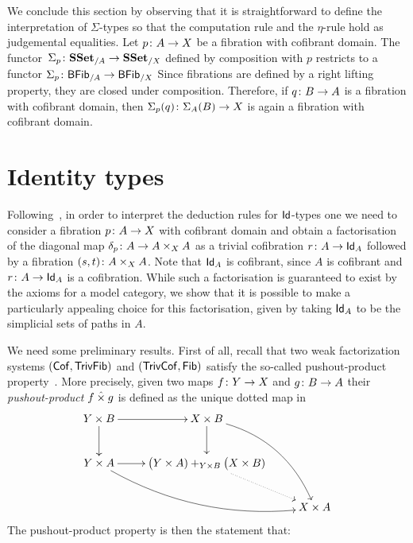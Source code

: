 \documentclass[reqno,10pt,a4paper,oneside,draft]{amsart}
\begin{document}
\begin{remark} 
We conclude this section by observing that it is straightforward to define the interpretation of
$\Sigma$-types so that the computation rule and the $\eta$-rule hold as judgemental equalities. 
Let  $p \colon A \to X$ be a fibration with cofibrant domain. The
functor~$\Sigma_p \colon \mathbf{SSet}_{/A} \to \mathbf{SSet}_{/X}$ defined by
composition with $p$ restricts to a functor
$\Sigma_p \colon \mathsf{BFib}_{/A}  \to \mathsf{BFib}_{/X}$
 Since fibrations are defined by a right lifting property, they are closed
under composition. Therefore, if $q \colon B \to A$ is a fibration with cofibrant domain, then
$\Sigma_p(q) \colon \Sigma_A(B) \to X$ is again a fibration with cofibrant domain.
\end{remark} 



\section{Identity types}

Following~\cite{awodey-warren:homotopy-idtype}, in order to interpret the deduction rules 
for $\mathsf{Id}$-types one we need to consider
a fibration $p \colon A \to X$ with cofibrant domain  and obtain a factorisation of the diagonal map $\delta_p \colon A \to A \times_X A$ as a trivial cofibration $r \colon A \to  \mathsf{Id}_A$ followed by a fibration
$(s,t) \colon A \times_X A$. Note that $\mathsf{Id}_A$ is cofibrant, since $A$ is cofibrant and $r \colon A \to \mathsf{Id}_A$ is a cofibration. While such a factorisation is guaranteed to exist by the axioms for a  model category, we show
that it is possible to make a particularly appealing choice for this factorisation, given by taking $\mathsf{Id}_A$ to be
the simplicial sets of paths in $A$. 

\medskip

We need some preliminary results. First of all, recall that
two weak factorization systems $(\mathsf{Cof}, \mathsf{TrivFib})$ and $(\mathsf{TrivCof}, \mathsf{Fib})$
satisfy the so-called pushout-product property~\cite{henry2018wms}. More precisely, given two maps $f \colon Y \rightarrow X$ and $g \colon B \rightarrow A$ their \emph{pushout-product} $f \mathbin{\hat{\times}} g$ is defined as the unique dotted map in
\[
\xymatrix{
Y \times B \ar[r] \ar[d] &  X \times B \ar[d] \ar@/^1.5pc/[ddr] \\
Y \times A \ar[r]  \ar@/_1.5pc/[drr] & \displaystyle \big( Y \times A ) +_{Y \times B} \big( X \times B ) \ar@{.>}[dr]  \\
 & & X \times A }
 \]
The pushout-product property is then the statement that:
\end{document}
